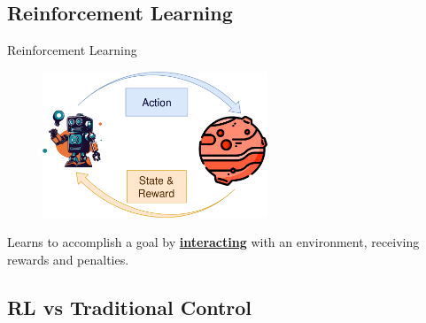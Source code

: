 \subsection{Reinforcement Learning}
\begin{frame}{Reinforcement Learning}
    \begin{figure}
      \centering
      \includegraphics[width=0.6\textwidth]{img/rl-cycle.png}
    \end{figure}
    Learns to accomplish a goal by \textbf{\underline{interacting}} with an environment, receiving rewards and penalties.
\end{frame}

\subsection{RL vs Traditional Control}

